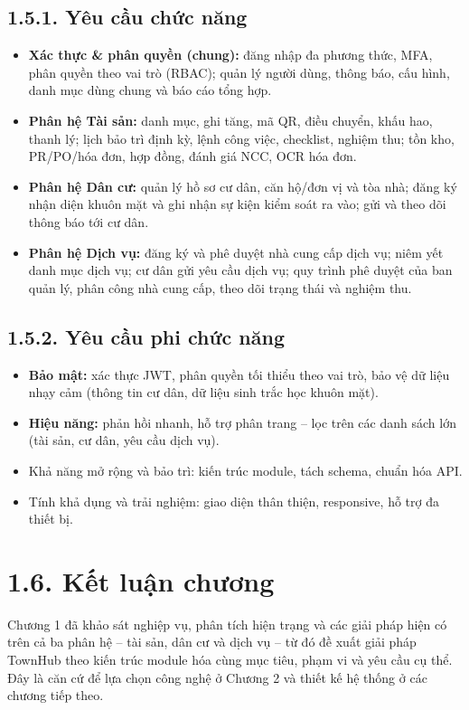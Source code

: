 \subsection*{1.5.1. Yêu cầu chức năng}
\begin{itemize}[leftmargin=1.4em,itemsep=1pt,topsep=2pt]
  \item \textbf{Xác thực \& phân quyền (chung): }đăng nhập đa phương thức, MFA, phân quyền theo vai trò (RBAC); quản lý người dùng, thông báo, cấu hình, danh mục dùng chung và báo cáo tổng hợp.
  \item \textbf{Phân hệ Tài sản: }danh mục, ghi tăng, mã QR, điều chuyển, khấu hao, thanh lý; lịch bảo trì định kỳ, lệnh công việc, checklist, nghiệm thu; tồn kho, PR/PO/hóa đơn, hợp đồng, đánh giá NCC, OCR hóa đơn.
  \item \textbf{Phân hệ Dân cư: }quản lý hồ sơ cư dân, căn hộ/đơn vị và tòa nhà; đăng ký nhận diện khuôn mặt và ghi nhận sự kiện kiểm soát ra vào; gửi và theo dõi thông báo tới cư dân.
  \item \textbf{Phân hệ Dịch vụ: }đăng ký và phê duyệt nhà cung cấp dịch vụ; niêm yết danh mục dịch vụ; cư dân gửi yêu cầu dịch vụ; quy trình phê duyệt của ban quản lý, phân công nhà cung cấp, theo dõi trạng thái và nghiệm thu.
\end{itemize}
\subsection*{1.5.2. Yêu cầu phi chức năng}
\begin{itemize}[leftmargin=1.4em,itemsep=1pt,topsep=2pt]
  \item \textbf{Bảo mật: }xác thực JWT, phân quyền tối thiểu theo vai trò, bảo vệ dữ liệu nhạy cảm (thông tin cư dân, dữ liệu sinh trắc học khuôn mặt).
  \item \textbf{Hiệu năng: }phản hồi nhanh, hỗ trợ phân trang – lọc trên các danh sách lớn (tài sản, cư dân, yêu cầu dịch vụ).
  \item Khả năng mở rộng và bảo trì: kiến trúc module, tách schema, chuẩn hóa API.
  \item Tính khả dụng và trải nghiệm: giao diện thân thiện, responsive, hỗ trợ đa thiết bị.
\end{itemize}
\section*{1.6. Kết luận chương}
Chương 1 đã khảo sát nghiệp vụ, phân tích hiện trạng và các giải pháp hiện có trên cả ba phân hệ – tài sản, dân cư và dịch vụ – từ đó đề xuất giải pháp TownHub theo kiến trúc module hóa cùng mục tiêu, phạm vi và yêu cầu cụ thể. Đây là căn cứ để lựa chọn công nghệ ở Chương 2 và thiết kế hệ thống ở các chương tiếp theo.

